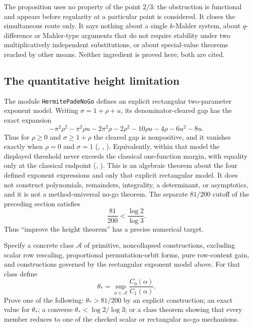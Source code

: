 \documentclass[11pt]{article}
\begin{document}
The proposition uses no property of the point $2/3$: the obstruction is
functional and appears before regularity at a particular point is considered.
It closes the simultaneous route only.  It says nothing about a single
$k$-Mahler system, about $q$-difference or Mahler-type arguments that do not
require stability under two multiplicatively independent substitutions, or about
special-value theorems reached by other means.  Neither ingredient is proved
here; both are cited.

\subsection{The quantitative height limitation}

The module \texttt{HermitePadeNoGo} defines an explicit rectangular
two-parameter exponent model.  Writing $\sigma=1+\rho+u$, its
denominator-cleared gap has the exact expansion
\[
 -\pi^2\rho^2-\pi^2\rho u-2\pi^2\rho-2\rho^2-10\rho u
 -4\rho-6u^2-8u.
\]
Thus for $\rho\ge0$ and $\sigma\ge1+\rho$ the cleared gap is nonpositive, and
it vanishes exactly when $\rho=0$ and $\sigma=1$
(,
,
).
Equivalently, within that model the displayed threshold never exceeds the
classical one-function margin, with equality only at the classical endpoint
(,
).
This is an algebraic theorem about the four defined exponent expressions and
only that explicit rectangular model.  It does not construct polynomials,
remainders, integrality, a determinant, or asymptotics, and it is not a
method-universal no-go theorem.
The separate $81/200$ cutoff of the preceding section satisfies
\[
 \frac{81}{200}<\frac{\log2}{\log3}.
\]
Thus “improve the height theorem” has a precise numerical target.

\begin{problem}
Specify a concrete class $\mathcal A$ of primitive, noncollapsed constructions,
excluding scalar row rescaling, proportional permutation-orbit forms, pure
row-content gain, and constructions governed by the rectangular exponent model
above.  For that class define
\[
 \theta_*=\sup_{\alpha\in\mathcal A}
   \frac{C_0(\alpha)}{C_1(\alpha)}.
\]
Prove one of the following: $\theta_*>81/200$ by an explicit construction;
an exact value for $\theta_*$; a converse
$\theta_*<\log2/\log3$; or a class theorem showing that every member reduces to
one of the checked scalar or rectangular no-go mechanisms.
\end{problem}
\end{document}
